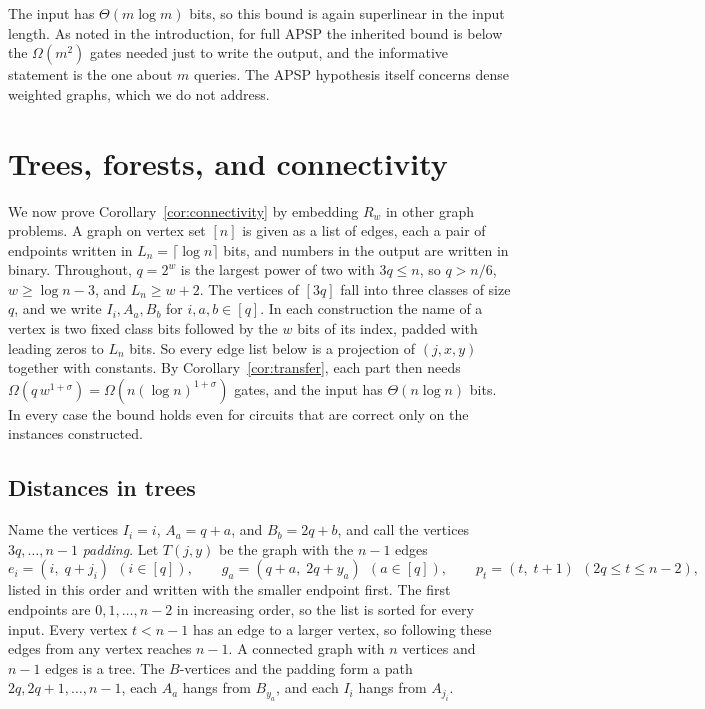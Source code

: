 \documentclass[11pt]{article}
\theoremstyle{definition}
\theoremstyle{remark}
\begin{document}
The input has $\Theta(m\log m)$ bits, so this bound is again superlinear
in the input length. As noted in the introduction, for full APSP the
inherited bound is below the $\Omega(m^2)$ gates needed just to write the
output, and the informative statement is the one about $m$ queries. The
APSP hypothesis itself concerns dense weighted graphs, which we do not
address.

\section{Trees, forests, and connectivity}\label{sec:connectivity}

We now prove Corollary~\ref{cor:connectivity} by embedding $R_w$ in other
graph problems. A graph on vertex set $[n]$ is given as a list of edges,
each a pair of endpoints written in $L_n=\lceil\log n\rceil$ bits, and
numbers in the output are written in binary. Throughout, $q=2^w$ is the
largest power of two with $3q\le n$, so $q>n/6$, $w\ge\log n-3$, and
$L_n\ge w+2$. The vertices of $[3q]$ fall into three classes of size $q$,
and we write $I_i,A_a,B_b$ for $i,a,b\in[q]$. In each construction the
name of a vertex is two fixed class bits followed by the $w$ bits of its
index, padded with leading zeros to $L_n$ bits. So every edge list below is
a projection of $(j,x,y)$ together with constants. By
Corollary~\ref{cor:transfer}, each part then needs
$\Omega(q\,w^{1+\sigma})=\Omega(n(\log n)^{1+\sigma})$ gates, and the
input has $\Theta(n\log n)$ bits. In every case the bound holds even for
circuits that are correct only on the instances constructed.

\subsection{Distances in trees}

Name the vertices $I_i=i$, $A_a=q+a$, and $B_b=2q+b$, and call the
vertices $3q,\dots,n-1$ \emph{padding}. Let $T(j,y)$ be the graph with the
$n-1$ edges
\[
e_i=(i,\;q+j_i)\ \ (i\in[q]),\qquad
g_a=(q+a,\;2q+y_a)\ \ (a\in[q]),\qquad
p_t=(t,\;t+1)\ \ (2q\le t\le n-2),
\]
listed in this order and written with the smaller endpoint first. The
first endpoints are $0,1,\dots,n-2$ in increasing order, so the list is
sorted for every input. Every vertex $t<n-1$ has an edge to a larger
vertex, so following these edges from any vertex reaches $n-1$. A
connected graph with $n$ vertices and $n-1$ edges is a tree. The
$B$-vertices and the padding form a path $2q,2q+1,\dots,n-1$, each
$A_a$ hangs from $B_{y_a}$, and each $I_i$ hangs from $A_{j_i}$.
\end{document}
